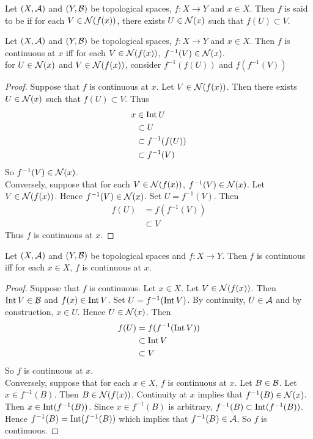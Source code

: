 \documentclass{book}
\begin{document}
	\begin{defn} 
	Let $(X,\mathcal{A})$ and $(Y,\mathcal{B})$ be topological spaces, $f:X \rightarrow Y$ and $x \in X$. Then $f$ is said to be  if for each $V \in \mathcal{N}(f(x))$, there exists $U \in \mathcal{N}(x)$ such that $f(U) \subset V$. 
	\end{defn}		
	
	\begin{ex} 
	Let $(X,\mathcal{A})$ and $(Y,\mathcal{B})$ be topological spaces, $f:X \rightarrow Y$ and $x \in X$. Then $f$ is continuous at $x$ iff for each $V \in \mathcal{N}(f(x))$, $f^{-1}(V) \in \mathcal{N}(x)$.\\
	 for $U \in \mathcal{N}(x)$ and $V \in \mathcal{N}(f(x))$, consider $f^{-1}(f(U))$ and $f(f^{-1}(V))$
	\end{ex}
	
	\begin{proof}
	Suppose that $f$ is continuous at $x$. Let $V \in \mathcal{N}(f(x))$. Then there exists $U \in \mathcal{N}(x)$ such that $f(U) \subset V$. Thus
	\begin{align*}
	x 
	&\in \operatorname{Int} U \\
	& \subset U \\
	&\subset f^{-1}(f(U)) \\
	&\subset f^{-1}(V)
	\end{align*}
	So $f^{-1}(V) \in \mathcal{N}(x)$.\\
	Conversely, suppose that for each $V \in \mathcal{N}(f(x))$, $f^{-1}(V) \in \mathcal{N}(x)$. Let $V \in \mathcal{N}(f(x))$. Hence $f^{-1}(V) \in \mathcal{N}(x)$. Set $U = f^{-1}(V)$. Then 
	\begin{align*}
	f(U) 
	&= f(f^{-1}(V)) \\
	& \subset V
	\end{align*}
	Thus $f$ is continuous at $x$.
	\end{proof}
	
	\begin{ex} 
	Let $(X,\mathcal{A})$ and $(Y,\mathcal{B})$ be topological spaces and $f:X \rightarrow Y$. Then $f$ is continuous iff for each $x \in X$, $f$ is continuous at $x$.
	\end{ex}
	
	\begin{proof}
	Suppose that $f$ is continuous. Let $x \in X$. Let $V \in \mathcal{N}(f(x))$. Then $\operatorname{Int} V \in \mathcal{B}$ and $f(x) \in \operatorname{Int} V$. Set $U = f^{-1}(\operatorname{Int} V)$. By continuity, $U \in \mathcal{A}$ and by construction, $x \in U$. Hence $U \in \mathcal{N}(x)$. Then 
	\begin{align*}
	f(U)
	&= f(f^{-1}(\operatorname{Int} V))\\
	& \subset \operatorname{Int} V\\
	& \subset V
\end{align*}	 	
So $f$ is continuous at $x$. \\
Conversely, suppose that for each $x \in X$, $f$ is continuous at $x$. Let $B \in \mathcal{B}$. Let $x \in f^{-1}(B)$. Then $B \in \mathcal{N}(f(x))$. Continuity at $x$ implies that $f^{-1}(B) \in \mathcal{N}(x)$. Then $x \in \operatorname{Int} (f^{-1}(B))$. Since $x \in f^{-1}(B)$ is arbitrary, $f^{-1}(B) \subset \operatorname{Int} (f^{-1}(B))$. Hence $f^{-1}(B) = \operatorname{Int} (f^{-1}(B))$ which implies that $f^{-1}(B) \in \mathcal{A}$. So $f$ is continuous.
	\end{proof}
	
\end{document}
